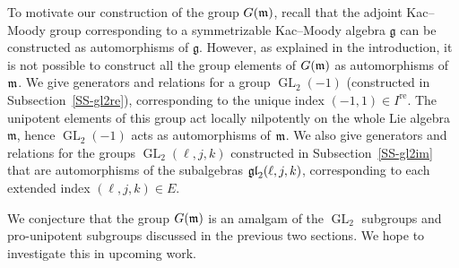 \documentclass[11pt,letterpaper]{amsart}
\numberwithin{thecounter}{section}
\theoremstyle{definition}
\DeclareMathOperator{\GL}{GL}
\DeclareMathOperator{\re}{{re}}
\DeclareMathOperator{\im}{{im}}
\begin{document}
To motivate our   construction of the group $G(\frak m)$, recall that the adjoint Kac--Moody group corresponding to a symmetrizable Kac--Moody algebra $\mathfrak{g}$ can be constructed as automorphisms of  $\mathfrak{g}$. However, as explained in the introduction, it is not possible to construct all the group elements of $G(\frak m)$ as automorphisms of $\frak m$. 
We give generators and relations for a group $\GL_2(-1)$ (constructed in Subsection~\ref{SS-gl2re}), corresponding to the unique  index $(-1,1)\in I^{\re}$. The unipotent elements of this group act locally nilpotently on the whole Lie algebra~$\mathfrak{m}$, hence $\GL_2(-1)$ acts as automorphisms of $\frak m$. We also give generators and relations for the groups $\GL_2(\ell,j,k)$ constructed in Subsection~\ref{SS-gl2im} that are automorphisms of the subalgebras $\frak{gl}_2(\ell,j,k)$, corresponding to each extended index $(\ell,j,k)\in E$.

 
We conjecture that the group $G(\frak m)$ is an amalgam of the $\GL_2$ subgroups and pro-unipotent subgroups discussed in the previous two sections. We hope to investigate this in upcoming work. %
\end{document}
